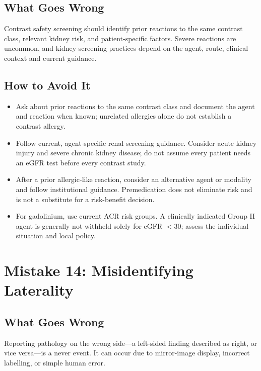 \subsection{What Goes Wrong}
Contrast safety screening should identify prior reactions to the same contrast class, relevant kidney risk, and patient-specific factors. Severe reactions are uncommon, and kidney screening practices depend on the agent, route, clinical context and current guidance.

\subsection{How to Avoid It}
\begin{itemize}
    \item Ask about prior reactions to the same contrast class and document the agent and reaction when known; unrelated allergies alone do not establish a contrast allergy.
    \item Follow current, agent-specific renal screening guidance. Consider acute kidney injury and severe chronic kidney disease; do not assume every patient needs an eGFR test before every contrast study.
    \item After a prior allergic-like reaction, consider an alternative agent or modality and follow institutional guidance. Premedication does not eliminate risk and is not a substitute for a risk-benefit decision.
    \item For gadolinium, use current ACR risk groups. A clinically indicated Group II agent is generally not withheld solely for eGFR $<30$; assess the individual situation and local policy.
\end{itemize}

\clearpage

\section{Mistake 14: Misidentifying Laterality}

\subsection{What Goes Wrong}
Reporting pathology on the wrong side---a left-sided finding described as right, or vice versa---is a never event. It can occur due to mirror-image display, incorrect labelling, or simple human error.

